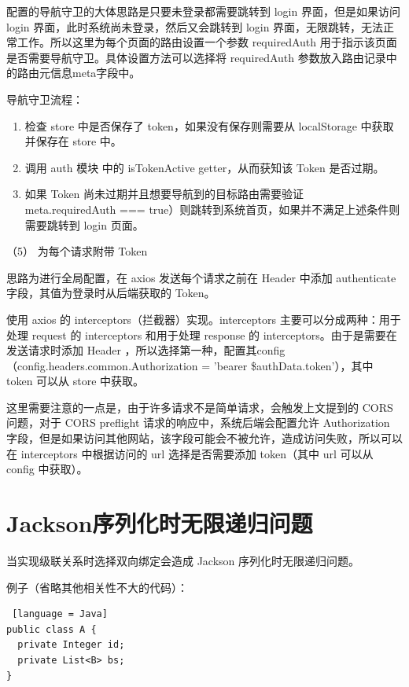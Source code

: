 配置的导航守卫的大体思路是只要未登录都需要跳转到 login 界面，但是如果访问 login 界面，此时系统尚未登录，然后又会跳转到 login 界面，无限跳转，无法正常工作。所以这里为每个页面的路由设置一个参数 requiredAuth 用于指示该页面是否需要导航守卫。具体设置方法可以选择将 requiredAuth 参数放入路由记录中的路由元信息meta字段中。

导航守卫流程：

\begin{enumerate}[label=\circled{\arabic*}]
  \item 检查 store 中是否保存了 token，如果没有保存则需要从 localStorage 中获取并保存在 store 中。
  \item 调用 auth 模块 中的 isTokenActive getter，从而获知该 Token 是否过期。
  \item 如果 Token 尚未过期并且想要导航到的目标路由需要验证\\meta.requiredAuth === true）则跳转到系统首页，如果并不满足上述条件则需要跳转到 login 页面。
\end{enumerate}

（5） 为每个请求附带 Token

思路为进行全局配置，在 axios 发送每个请求之前在 Header 中添加 authenticate 字段，其值为登录时从后端获取的 Token。

使用 axios 的 interceptors（拦截器）实现。interceptors 主要可以分成两种：用于处理 request 的 interceptors 和用于处理 response 的 interceptors。由于是需要在发送请求时添加 Header ，所以选择第一种，配置其config（config.headers.common.Authorization = 'bearer \${authData.token}'），其中 token 可以从 store 中获取。

这里需要注意的一点是，由于许多请求不是简单请求，会触发上文提到的 CORS 问题，对于 CORS preflight 请求的响应中，系统后端会配置允许 Authorization 字段，但是如果访问其他网站，该字段可能会不被允许，造成访问失败，所以可以在 interceptors 中根据访问的 url 选择是否需要添加 token（其中 url 可以从 config 中获取）。

\section{Jackson序列化时无限递归问题}

当实现级联关系时选择双向绑定会造成 Jackson 序列化时无限递归问题。

例子（省略其他相关性不大的代码）：

\begin{lstlisting} [language = Java]
public class A {
  private Integer id;
  private List<B> bs;
}
\end{lstlisting}

